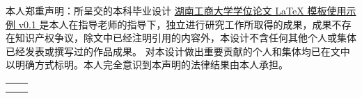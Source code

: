 
\begin{declarationzh}
		
本人郑重声明：所呈交的本科毕业设计 \uline{ 湖南工商大学学位论文 \LaTeX{} 模板使用示例 v0.1 } 是本人在指导老师的指导下，独立进行研究工作所取得的成果，成果不存在知识产权争议，除文中已经注明引用的内容外，本设计不含任何其他个人或集体已经发表或撰写过的作品成果。
对本设计做出重要贡献的个人和集体均已在文中以明确方式标明。本人完全意识到本声明的法律结果由本人承担。
	
	\vspace{30pt}
	\begin{tabular}{ll}
		\hspace{240pt} \makebox[4em][s]{作者签名：  颜磊  } & \underline{\makebox[100pt][c]{  }} \\
		\hspace{240pt} \makebox[4em][s]{日\qquad 期:}	 &
		\underline{\makebox[100pt][c]{\qquad2025年\quad1月\quad3日 }} \\
	\end{tabular}

	
	
\end{declarationzh}